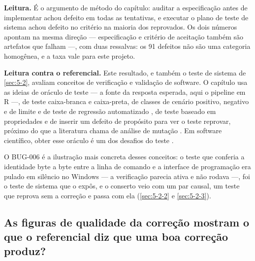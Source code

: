 
\textbf{Leitura.} É o argumento de método do capítulo: auditar a especificação antes de implementar achou defeito em todas as tentativas, e executar o plano de teste de sistema achou defeito no critério na maioria dos reprovados. Os dois números apontam na mesma direção --- especificação e critério de aceitação também são artefatos que falham ---, com duas ressalvas: os 91 defeitos não são uma categoria homogênea, e a taxa vale para este projeto.

\textbf{Leitura contra o referencial.} Este resultado, e também o teste de sistema de \ref{sec:5-2}, avaliam conceitos de verificação e validação de software. O capítulo usa as ideias de oráculo de teste --- a fonte da resposta esperada, aqui o pipeline em R \cite{barr2015oracle} ---, de teste caixa-branca e caixa-preta, de classes de cenário positivo, negativo e de limite e de teste de regressão automatizado \cite{myers2012art}, de teste baseado em propriedades \cite{claessen2000quickcheck,maciver2019hypothesis} e de inserir um defeito de propósito para ver o teste reprovar, próximo do que a literatura chama de análise de mutação \cite{jia2011mutation}. Em software científico, obter esse oráculo é um dos desafios do teste \cite{kanewala2014testing,weyuker1982testing}.


O BUG-006 é a ilustração mais concreta desses conceitos: o teste que conferia a identidade byte a byte entre a linha de comando e a interface de programação era pulado em silêncio no Windows --- a verificação parecia ativa e não rodava ---, foi o teste de sistema que o expôs, e o conserto veio com um par causal, um teste que reprova sem a correção e passa com ela (\ref{sec:5-2-2} e \ref{sec:5-2-3}).

\subsection{As figuras de qualidade da correção mostram o que o referencial diz que uma boa correção produz?}\label{sec:5-3-7}

